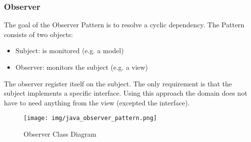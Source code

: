 \documentclass[11pt]{article}
\begin{document}
\subsubsection{Observer}
\label{sec:orgeafeaef}

The goal of the Observer Pattern is to resolve a cyclic dependency.
The Pattern consists of two objects:
\begin{itemize}
\item Subject: is monitored (e.g. a model)
\item Observer: monitors the subject (e.g. a view)
\end{itemize}


The observer register itself on the subject.
The only requirement is that the subject implements a specific interface.
Using this approach the domain does not have to need anything from the view (excepted the interface).

\begin{figure}[htbp]
\centering
\texttt{[image: img/java\_observer\_pattern.png]}
\caption{\label{fig:observer-class-diagram}Observer Class Diagram}
\end{figure}
\end{document}
